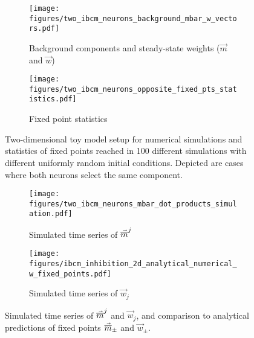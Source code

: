 \begin{figure}
  \begin{subfigure}[b]{.35\textwidth}
	\centering
	\texttt{[image: figures/two\_ibcm\_neurons\_background\_mbar\_w\_vectors.pdf]}
	\caption{Background components and steady-state weights ($\vec{m}$ and $\vec{w}$)}
	\label{subfig:components_2d}
  \end{subfigure}\hfill
  \begin{subfigure}[b]{.64\textwidth}
	\centering
	\texttt{[image: figures/two\_ibcm\_neurons\_opposite\_fixed\_pts\_statistics.pdf]}
	\caption{Fixed point statistics}
	\label{subfig:ibcm_2neuron_distribution}
  \end{subfigure}
\caption{Two-dimensional toy model setup for numerical simulations and statistics of fixed points reached in 100 different simulations with different uniformly random initial conditions. Depicted are cases where both neurons select the same component. }
\label{fig:ibcm_2d_model}
\end{figure}

\begin{figure}
\begin{subfigure}[b]{.49\textwidth}
	\centering
	\texttt{[image: figures/two\_ibcm\_neurons\_mbar\_dot\_products\_simulation.pdf]}
	\caption{Simulated time series of $\vec{\overline{m}}^j$}
	\label{subfig:ibcm_mbar_2d_simulation}
  \end{subfigure} \hfill
  \begin{subfigure}[b]{.49\textwidth}
	\centering
	\texttt{[image: figures/ibcm\_inhibition\_2d\_analytical\_numerical\_w\_fixed\_points.pdf]}
	\caption{Simulated time series of $\vec{w}_j$ }
	\label{subfig:ibcm_w_2d_simulation}
  \end{subfigure}
  \caption{Simulated time series of $\vec{\overline{m}}^j$ and $\vec{w}_j$, and comparison to analytical predictions of fixed points $\vec{\overline{m}}_{\pm}$ and $\vec{w}_{\pm}$. }
\label{fig:ibcm_2d_simulations}
\end{figure}


